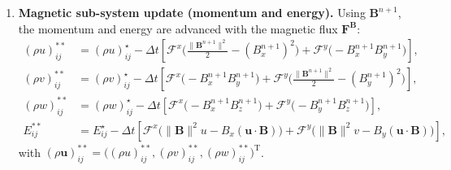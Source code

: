 \documentclass[a4paper,fleqn]{cas-sc}
\theoremstyle{definition}
\theoremstyle{remark}
\begin{document}
\begin{enumerate}
\item \textbf{Magnetic sub-system update (momentum and energy).}
Using $\mathbf{B}^{n+1}$, the momentum and energy are advanced with the magnetic
flux $\mathbf{F}^{\mathbf{B}}$:
\begin{equation}
\begin{aligned}
(\rho u)_{ij}^{**}
&= (\rho u)_{ij}^{\star}
 - \Delta t\left[\mathcal{F}^{x}\!\Big(\tfrac{\|\mathbf{B}^{n+1}\|^{2}}{2}-(B_x^{n+1})^{2}\Big)
 + \mathcal{F}^{y}\!\big(-B_x^{n+1}B_y^{n+1}\big)\right],\\
(\rho v)_{ij}^{**}
&= (\rho v)_{ij}^{\star}
 - \Delta t\left[\mathcal{F}^{x}\!\big(-B_x^{n+1}B_y^{n+1}\big)
 + \mathcal{F}^{y}\!\Big(\tfrac{\|\mathbf{B}^{n+1}\|^{2}}{2}-(B_y^{n+1})^{2}\Big)\right],\\
(\rho w)_{ij}^{**}
&= (\rho w)_{ij}^{\star}
 - \Delta t\left[\mathcal{F}^{x}\!\big(-B_x^{n+1}B_z^{n+1}\big)
 + \mathcal{F}^{y}\!\big(-B_y^{n+1}B_z^{n+1}\big)\right],\\
E_{ij}^{**}
&= E_{ij}^{\star}
 - \Delta t\left[\mathcal{F}^{x}\!\big(\|\mathbf{B}\|^{2}u-B_x(\mathbf{u}\!\cdot\!\mathbf{B})\big)
 + \mathcal{F}^{y}\!\big(\|\mathbf{B}\|^{2}v-B_y(\mathbf{u}\!\cdot\!\mathbf{B})\big)\right],
\end{aligned}
\end{equation}
with $(\rho\mathbf{u})_{ij}^{**}=\big((\rho u)_{ij}^{**},(\rho v)_{ij}^{**},
(\rho w)_{ij}^{**}\big)^{\mathrm{T}}$.


\end{enumerate}
\end{document}
